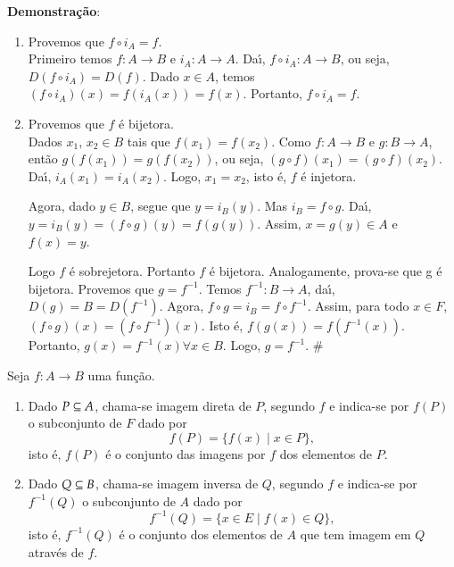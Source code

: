 \textbf{Demonstra{\c c}{\~a}o}:
\begin{enumerate}
\item Provemos que $f\circ i_{A}=f$.\\
Primeiro temos $f:A\rightarrow B$ e $i_{A}:A\rightarrow A$. Da{\'\i}, $f\circ i_{A}:A\rightarrow B$, ou seja, $D(f\circ i_{A})=D(f)$. Dado $x\in A$, temos $(f\circ i_{A})(x)=f(i_{A}(x))=f(x)$. Portanto, $f\circ i_{A}=f$.
\item Provemos que $f$ {\'e} bijetora.\\
Dados $x_{1}$, $x_{2}\in B$ tais que $f(x_{1})=f(x_{2})$. Como $f:A\rightarrow B$ e $g:B\rightarrow A$, ent{\~a}o $g(f(x_{1}))=g(f(x_{2}))$, ou seja, $(g\circ f)(x_{1})=(g\circ f)(x_{2})$. Da{\'\i}, $i_{A}(x_{1})=i_{A}(x_{2})$. Logo, $x_{1}=x_{2}$, isto {\'e}, $f$ {\'e} injetora.

Agora, dado $y\in B$, segue que $y=i_{B}(y)$. Mas $i_{B}=f\circ g$. Da{\'\i}, $y=i_{B}(y)=(f\circ g)(y)=f(g(y))$. Assim, $x=g(y)\in A$ e $f(x)=y$.

Logo $f$ {\'e} sobrejetora. Portanto $f$ {\'e} bijetora. Analogamente, prova-se que g {\'e} bijetora. Provemos que $g=f^{-1}$. Temos  $f^{-1}:B\rightarrow A$, da{\'\i}, $D(g) = B = D(f^{-1})$. Agora, $f\circ g = i_{B} = f\circ f^{-1}$. Assim, para todo $x\in F$, $(f\circ g)(x)=(f\circ f^{-1})(x)$. Isto {\'e}, $f(g(x))=f(f^{-1}(x))$. Portanto, $g(x)=f^{-1}(x)\forall x\in B$. Logo, $g=f^{-1}$. \#
\end{enumerate}

\begin{definicao}
Seja $f : A \to B$ uma fun{\c c}{\~a}o.
\begin{enumerate}
\item Dado $P \subseteq A$, chama-se {\rm imagem direta} de $P$, segundo $f$ e indica-se por $f(P)$ o subconjunto de $F$ dado por
\[
f(P) = \{f(x) \mid x \in P\},
\]
isto {\'e}, $f(P)$ {\'e} o conjunto das imagens por $f$ dos elementos de $P$.

\item Dado $Q \subseteq B$, chama-se {\rm imagem inversa} de $Q$, segundo $f$ e indica-se por $f^{-1}(Q)$ o subconjunto de $A$ dado por
\[
f^{-1}(Q) = \{x \in E \mid f(x) \in Q\},
\]
isto {\'e}, $f^{-1}(Q)$ {\'e} o conjunto dos elementos de $A$ que tem imagem em $Q$ atrav{\'e}s de $f$.
\end{enumerate}
\end{definicao}

